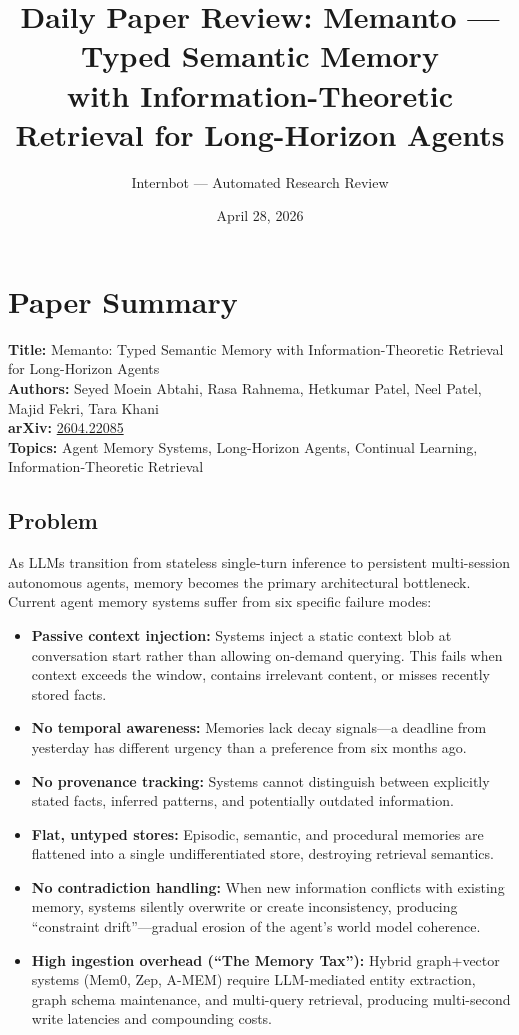 \documentclass[11pt]{article}
\title{Daily Paper Review: Memanto --- Typed Semantic Memory\\with Information-Theoretic Retrieval for Long-Horizon Agents}
\author{Internbot --- Automated Research Review}
\date{April 28, 2026}
\begin{document}
\maketitle

\section{Paper Summary}

\textbf{Title:} Memanto: Typed Semantic Memory with Information-Theoretic Retrieval for Long-Horizon Agents \\
\textbf{Authors:} Seyed Moein Abtahi, Rasa Rahnema, Hetkumar Patel, Neel Patel, Majid Fekri, Tara Khani \\
\textbf{arXiv:} \href{https://arxiv.org/abs/2604.22085}{2604.22085} \\
\textbf{Topics:} Agent Memory Systems, Long-Horizon Agents, Continual Learning, Information-Theoretic Retrieval

\subsection{Problem}

As LLMs transition from stateless single-turn inference to persistent multi-session autonomous agents, memory becomes the primary architectural bottleneck. Current agent memory systems suffer from six specific failure modes:

\begin{itemize}
    \item \textbf{Passive context injection:} Systems inject a static context blob at conversation start rather than allowing on-demand querying. This fails when context exceeds the window, contains irrelevant content, or misses recently stored facts.
    \item \textbf{No temporal awareness:} Memories lack decay signals---a deadline from yesterday has different urgency than a preference from six months ago.
    \item \textbf{No provenance tracking:} Systems cannot distinguish between explicitly stated facts, inferred patterns, and potentially outdated information.
    \item \textbf{Flat, untyped stores:} Episodic, semantic, and procedural memories are flattened into a single undifferentiated store, destroying retrieval semantics.
    \item \textbf{No contradiction handling:} When new information conflicts with existing memory, systems silently overwrite or create inconsistency, producing ``constraint drift''---gradual erosion of the agent's world model coherence.
    \item \textbf{High ingestion overhead (``The Memory Tax''):} Hybrid graph+vector systems (Mem0, Zep, A-MEM) require LLM-mediated entity extraction, graph schema maintenance, and multi-query retrieval, producing multi-second write latencies and compounding costs.
\end{itemize}
\end{document}
